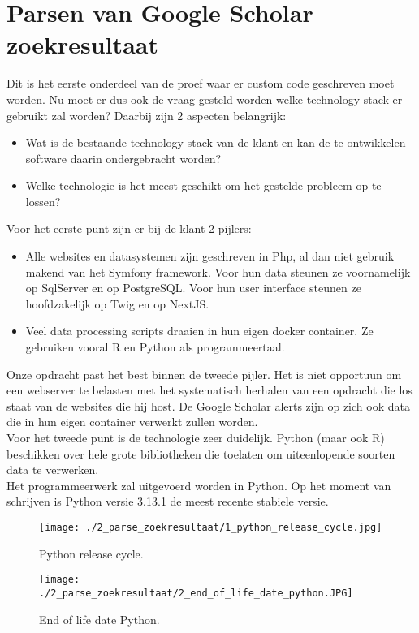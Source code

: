 \section{Parsen van Google Scholar zoekresultaat}
Dit is het eerste onderdeel van de proef waar er custom code geschreven moet worden. Nu moet er dus ook de vraag gesteld worden welke technology stack er gebruikt zal worden? Daarbij zijn 2 aspecten belangrijk:
\begin{itemize}
    \item Wat is de bestaande technology stack van de klant en kan de te ontwikkelen software daarin ondergebracht worden?
    \item Welke technologie is het meest geschikt om het gestelde probleem op te lossen?
\end{itemize}
Voor het eerste punt zijn er bij de klant 2 pijlers:
\begin{itemize}
    \item Alle websites en datasystemen zijn geschreven in Php, al dan niet gebruik makend van het Symfony framework. Voor hun data steunen ze voornamelijk op SqlServer en op PostgreSQL. Voor hun user interface steunen ze hoofdzakelijk op Twig en op NextJS.
    \item Veel data processing scripts draaien in hun eigen docker container. Ze gebruiken vooral R en Python als programmeertaal.
\end{itemize}
Onze opdracht past het best binnen de tweede pijler. Het is niet opportuun om een webserver te belasten met het systematisch herhalen van een opdracht die los staat van de websites die hij host. De Google Scholar alerts zijn op zich ook data die in hun eigen container verwerkt zullen worden.\\
Voor het tweede punt is de technologie zeer duidelijk. Python (maar ook R) beschikken over hele grote bibliotheken die toelaten om uiteenlopende soorten data te verwerken.\\
Het programmeerwerk zal uitgevoerd worden in Python. Op het moment van schrijven is Python versie 3.13.1 de meest recente stabiele versie.
\begin{figure}
    \centering
    \texttt{[image: ./2\_parse\_zoekresultaat/1\_python\_release\_cycle.jpg]}
    \caption[Python release cycle.]{\label{fig:Python release cycle}Python release cycle.\autocite{pythonreleasecycle2025}}
\end{figure}
\begin{figure}
    \centering
    \texttt{[image: ./2\_parse\_zoekresultaat/2\_end\_of\_life\_date\_python.JPG]}
    \caption[End of life date Python.]{\label{fig:End of life date Python}End of life date Python.\autocite{endoflifedatepython2025}}
\end{figure}



